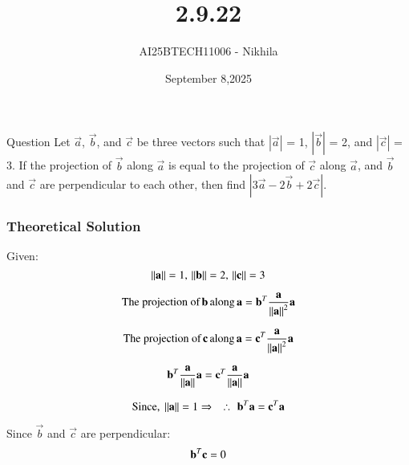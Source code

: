 \documentclass{beamer}
\title
{2.9.22}
\date{September 8,2025}
\author 
{AI25BTECH11006 - Nikhila}
\begin{document}
\frame{\titlepage}
\begin{frame}{Question}
 Let $\overrightarrow{a}$,
$\overrightarrow{b}$, and $\overrightarrow{c}$ be three vectors such that $|\overrightarrow{a}|$ = 1, $|\overrightarrow{b}|$ = 2, and $|\overrightarrow{c}|$ = 3. If the
projection of $\overrightarrow{b}$ along $\overrightarrow{a}$ is equal to the projection of $\overrightarrow{c}$ along $\overrightarrow{a}$, and $\overrightarrow{b}$ and $\overrightarrow{c}$ are perpendicular to each other, then find $|3\overrightarrow{a} - 2\overrightarrow{b} + 2\overrightarrow{c}|$.
\end{frame}


\begin{frame}[fragile]
    \frametitle{Theoretical Solution}
Given: 
\begin{equation}
\norm{\vec{a}} = 1, \, \norm{\vec{b}} = 2, \, \norm{\vec{c}} = 3\\
\end{equation}

\begin{equation}
\text{The projection of} \, \vec{b} \, \text{along} \, \vec{a} = \vec{b}^T\dfrac{\vec{a}}{\norm{\vec{a}}^2}\vec{a}    
\end{equation}

\begin{equation}
\text{The projection of} \, \vec{c} \, \text{along} \, \vec{a} = \vec{c}^T\dfrac{\vec{a}}{\norm{\vec{a}}^2}\vec{a}    
\end{equation}


\begin{equation}
\vec{b}^T\dfrac{\vec{a}}{\norm{\vec{a}}}\vec{a} = \vec{c}^T\dfrac{\vec{a}}{\norm{\vec{a}}}\vec{a}\\
\end{equation}

\begin{equation}
\text{Since, } \norm{\vec{a}} = 1
\Rightarrow \quad
\therefore \, \, \vec{b}^T\vec{a} = \vec{c}^T\vec{a}
\end{equation}

Since $\vec{b}$ and $\vec{c}$ are perpendicular: 
\begin{equation}
\vec{b}^T\vec{c} = 0\\
\end{equation}

\end{frame}
\end{document}
